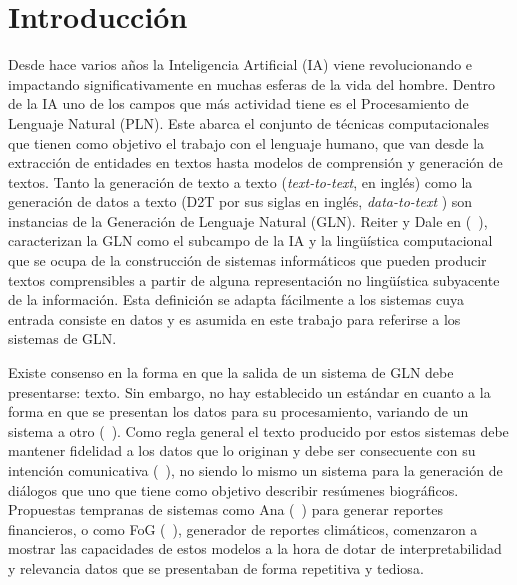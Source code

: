 \chapter*{Introducción}\label{chapter:introduction}

    Desde hace varios años la Inteligencia Artificial (IA) viene revolucionando e \\impactando significativamente en muchas esferas de la 
vida del hombre. Dentro de la IA uno de los campos que más actividad tiene es el Procesamiento de Lenguaje Natural (PLN). Este abarca el conjunto de 
t\'ecnicas computacionales que tienen como objetivo el trabajo con el lenguaje humano, que van desde la extracci\'on de entidades en textos hasta modelos 
de comprensi\'on y generación de textos. Tanto la generación de texto a texto (\emph{text-to-text}, en inglés) como la generación de 
datos a texto (D2T por sus siglas en inglés, \emph{data-to-text} ) son instancias de la Generación de Lenguaje Natural (GLN). Reiter y Dale en (~\cite{Reiter1997BuildingAN}), 
caracterizan la GLN como el subcampo de la IA y la lingüística computacional que se ocupa de la construcción de sistemas informáticos que pueden 
producir textos comprensibles a partir de alguna representación no lingüística subyacente de la información. 
Esta definición se adapta fácilmente a los sistemas cuya entrada consiste en datos y es asumida en este trabajo para referirse a los sistemas de GLN. 
    
    Existe consenso en la forma en que la salida de un sistema de GLN debe presentarse: texto. Sin embargo, no hay establecido un est\'andar en cuanto a la forma en 
que se presentan los datos para su procesamiento, variando de un sistema a otro (~\cite{reiter_dale_2000,Gatt2018SurveyOT}). Como regla general el texto producido por estos sistemas 
debe mantener fidelidad a los datos que lo originan y debe ser consecuente con su intención comunicativa (~\cite{reiter_dale_2000}), no siendo lo mismo un 
sistema para la generación de diálogos que uno que tiene como objetivo describir resúmenes biográficos. Propuestas tempranas de sistemas como Ana (~\cite{kukich1983design}) para 
generar reportes financieros, o como FoG (~\cite{goldberg1994using}), generador de reportes climáticos, comenzaron a mostrar las capacidades de estos 
modelos a la hora de dotar de interpretabilidad y relevancia datos que se presentaban de forma repetitiva y tediosa.
  
